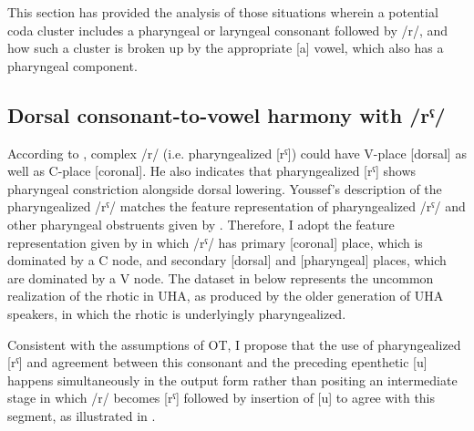 \documentclass[output=paper,colorlinks,citecolor=brown]{langscibook}
\begin{document}
This section has provided the analysis of those situations wherein a potential coda cluster  includes a pharyngeal or laryngeal consonant followed by /r/, and how such a cluster is broken up by the appropriate [a] vowel, which also has a pharyngeal component.


\subsection{Dorsal consonant-to-vowel harmony with /rˤ/}\label{dorscv}

According to \citet{Youssef2019}, complex /r/ (i.e. pharyngealized [rˤ]) could have V-place [dorsal] as well as C-place [coronal]. He also indicates that pharyngealized [rˤ] shows pharyngeal constriction alongside dorsal lowering. Youssef’s description of the pharyngealized /rˤ/ matches the feature representation of pharyngealized /rˤ/ and other pharyngeal obstruents given by \citet{Herzallah1990}. Therefore, I adopt the feature representation given by \citet{Herzallah1990}  in which /rˤ/ has primary [coronal] place, which is dominated by a C node, and secondary [dorsal] and [pharyngeal] places, which are dominated by a V node. The dataset in  below represents the uncommon realization of the rhotic in UHA, as produced by the older generation of UHA speakers, in which the rhotic is underlyingly pharyngealized.

Consistent with the assumptions of OT, I propose that the use of pharyngealized [rˤ] and agreement between this consonant  and the preceding epenthetic [u] happens simultaneously in the output form rather than positing an intermediate stage in which /r/ becomes [rˤ] followed by insertion of [u] to agree with this segment, as illustrated in .


\begin{table}
\caption{[rˤ] consonant-to-vowel harmony}
\label{rphar}
\end{table}
\end{document}
